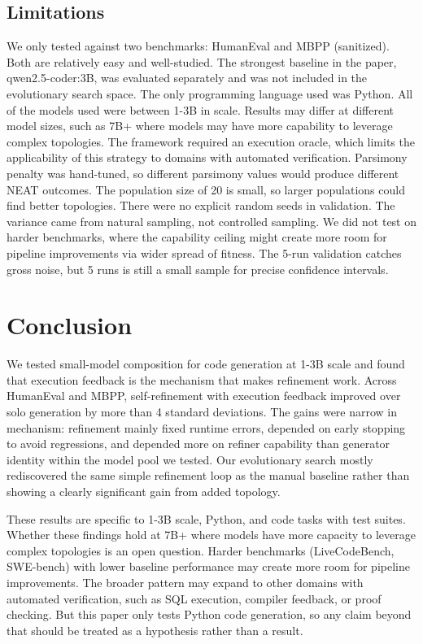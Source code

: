\documentclass{article}
\begin{document}
\subsection{Limitations}
We only tested against two benchmarks: HumanEval and MBPP (sanitized). Both are relatively easy and well-studied. The strongest baseline in the paper, qwen2.5-coder:3B, was evaluated separately and was not included in the evolutionary search space. The only programming language used was Python. All of the models used were between 1-3B in scale. Results may differ at different model sizes, such as 7B+ where models may have more capability to leverage complex topologies. The framework required an execution oracle, which limits the applicability of this strategy to domains with automated verification. Parsimony penalty was hand-tuned, so different parsimony values would produce different NEAT outcomes. The population size of 20 is small, so larger populations could find better topologies. There were no explicit random seeds in validation. The variance came from natural sampling, not controlled sampling. We did not test on harder benchmarks, where the capability ceiling might create more room for pipeline improvements via wider spread of fitness. The 5-run validation catches gross noise, but 5 runs is still a small sample for precise confidence intervals.

\section{Conclusion}
We tested small-model composition for code generation at 1-3B scale and found that execution feedback is the mechanism that makes refinement work. Across HumanEval and MBPP, self-refinement with execution feedback improved over solo generation by more than 4 standard deviations. The gains were narrow in mechanism: refinement mainly fixed runtime errors, depended on early stopping to avoid regressions, and depended more on refiner capability than generator identity within the model pool we tested. Our evolutionary search mostly rediscovered the same simple refinement loop as the manual baseline rather than showing a clearly significant gain from added topology.

These results are specific to 1-3B scale, Python, and code tasks with test suites. Whether these findings hold at 7B+ where models have more capacity to leverage complex topologies is an open question. Harder benchmarks (LiveCodeBench, SWE-bench) with lower baseline performance may create more room for pipeline improvements. The broader pattern may expand to other domains with automated verification, such as SQL execution, compiler feedback, or proof checking. But this paper only tests Python code generation, so any claim beyond that should be treated as a hypothesis rather than a result.



\end{document}
